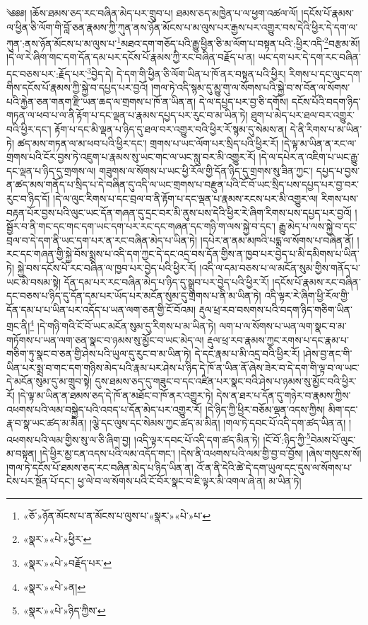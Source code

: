  ༄༅༅། །ཆོས་ཐམས་ཅད་རང་བཞིན་མེད་པར་གྲུབ་པ། ཐམས་ཅད་མཁྱེན་པ་ལ་ཕྱག་འཚལ་ལོ། །དངོས་པོ་རྣམས་ལ་ཕྱིན་ཅི་ལོག་གི་བློ་ཅན་རྣམས་ཀྱི་ཀུན་ནས་ཉོན་མོངས་པ་མ་ལུས་པར་རྒྱས་པར་འགྱུར་བས་དེའི་ཕྱིར་དེ་དག་ལ་ཀུན་:ནས་ཉོན་མོངས་པ་མ་ལུས་པ་\footnote{«ཅོ་»ཉོན་མོངས་པ་ན་མོངས་པ་ལུས་པ་«སྣར་»«པེ་»པ་}མཐའ་དག་གཅོད་པའི་རྒྱུ་ཕྱིན་ཅི་མ་ལོག་པ་བསྟན་པའི་:ཕྱིར་འདི་\footnote{«སྣར་»«པེ་»ཕྱིར་}བརྩམ་མོ། །དེ་ལ་རེ་ཞིག་གང་དག་དོན་དམ་པར་དངོས་པོ་རྣམས་ཀྱི་རང་བཞིན་བརྗོད་པ་ན། ཡང་དག་པར་དེ་དག་རང་བཞིན་དང་བཅས་པར་:རྗོད་པར་\footnote{«སྣར་»«པེ་»བརྗོད་པར་}བྱེད་དེ། དེ་དག་གི་ཕྱིན་ཅི་ལོག་ཡིན་པ་ཁོ་ནར་བསྟན་པའི་ཕྱིར། རིགས་པ་དང་ལུང་དག་གིས་དངོས་པོ་རྣམས་ཀྱི་སྐྱེ་བ་དཔྱད་པར་བྱའོ། །གལ་ཏེ་འདི་སྙམ་དུ་མྱུ་གུ་ལ་སོགས་པའི་སྐྱེ་བ་ས་བོན་ལ་སོགས་པའི་རྐྱེན་ཅན་གནག་རྫི་ཡན་ཆད་ལ་གྲགས་པ་ཁོ་ན་ཡིན་ན། དེ་ལ་དཔྱད་པར་བྱ་ཅི་དགོས། དངོས་པོའི་བདག་ཉིད་གཏན་ལ་ཕབ་པ་ལ་ནི་རྟོག་པ་དང་ལྡན་པ་རྣམས་དཔྱད་པར་རུང་བ་མ་ཡིན་ཏེ། ཐུག་པ་མེད་པར་ཐལ་བར་འགྱུར་བའི་ཕྱིར་དང་། རྟོག་པ་དང་མི་ལྡན་པ་ཉིད་དུ་ཐལ་བར་འགྱུར་བའི་ཕྱིར་རོ་སྙམ་དུ་སེམས་ན། དེ་ནི་རིགས་པ་མ་ཡིན་ཏེ། ཚད་མས་གཏན་ལ་མ་ཕབ་པའི་ཕྱིར་དང་། གྲགས་པ་ཡང་ལོག་པར་སྲིད་པའི་ཕྱིར་རོ། །དེ་ལྟ་མ་ཡིན་ན་རང་ལ་གྲགས་པའི་ངོར་བྱས་ཏེ་འཇུག་པ་རྣམས་སུ་ཡང་གང་ལ་ཡང་སླུ་བར་མི་འགྱུར་རོ། །དེ་ལ་དཔེར་ན་འཇིག་པ་ཡང་རྒྱུ་དང་ལྡན་པ་ཉིད་དུ་གྲགས་ལ། གཟུགས་ལ་སོགས་པ་ཡང་ཕྱི་རོལ་གྱི་དོན་ཉིད་དུ་གྲགས་སུ་ཟིན་ཀྱང་། དཔྱད་པ་བྱས་ན་ཚད་མས་གནོད་པ་སྲིད་པ་དེ་བཞིན་དུ་འདི་ལ་ཡང་གྲགས་པ་བརྫུན་པའི་ངོ་བོ་ཡང་སྲིད་པས་དཔྱད་པར་བྱ་བར་རུང་བ་ཉིད་དོ། །དེ་ལ་ལུང་རིགས་པ་དང་བྲལ་བ་ནི་རྟོག་པ་དང་ལྡན་པ་རྣམས་རངས་པར་མི་འགྱུར་ལ། རིགས་པས་བརྟན་པོར་བྱས་པའི་ལུང་ཡང་དོན་གཞན་དུ་དྲང་བར་མི་ནུས་པས་དེའི་ཕྱིར་རེ་ཞིག་རིགས་པས་དཔྱད་པར་བྱའོ། །སྦྱོར་བ་ནི་གང་དང་གང་དག་ཡང་དག་པར་རང་དང་གཞན་དང་གཉི་ག་ལས་སྐྱེ་བ་དང་། རྒྱུ་མེད་པ་ལས་སྐྱེ་བ་དང་བྲལ་བ་དེ་དག་ནི་ཡང་དག་པར་ན་རང་བཞིན་མེད་པ་ཡིན་ཏེ། །དཔེར་ན་ནམ་མཁའི་པདྨ་ལ་སོགས་པ་བཞིན་ནོ། །རང་དང་གཞན་གྱི་སྐྱེ་བོས་སྨྲས་པ་འདི་དག་ཀྱང་དེ་དང་འདྲ་བས་དོན་གྱིས་ན་ཁྱབ་པར་བྱེད་པ་མི་དམིགས་པ་ཡིན་ཏེ། སྐྱེ་བས་དངོས་པོ་རང་བཞིན་ལ་ཁྱབ་པར་བྱེད་པའི་ཕྱིར་རོ། །འདི་ལ་དམ་བཅས་པ་ལ་མངོན་སུམ་གྱིས་གནོད་པ་ཡང་མི་བསམ་སྟེ། དོན་དམ་པར་རང་བཞིན་མེད་པ་ཉིད་དུ་སྒྲུབ་པར་བྱེད་པའི་ཕྱིར་རོ། །དངོས་པོ་རྣམས་རང་བཞིན་དང་བཅས་པ་ཉིད་དུ་དོན་དམ་པར་ཡོད་པར་མངོན་སུམ་དུ་གྲགས་པ་ནི་མ་ཡིན་ཏེ། འདི་ལྟར་རེ་ཞིག་ཕྱི་རོལ་གྱི་དོན་དམ་པ་པ་ཡིན་པར་འདོད་པ་ཡན་ལག་ཅན་གྱི་ངོ་བོའམ། རྡུལ་ཕྲ་རབ་བསགས་པའི་བདག་ཉིད་གཅིག་ཡིན་གྲང་ནི།\footnote{«སྣར་»«པེ་»ན།} །དེ་གཉི་གའི་ངོ་བོ་ཡང་མངོན་སུམ་དུ་རིགས་པ་མ་ཡིན་ཏེ། ལག་པ་ལ་སོགས་པ་ཡན་ལག་སྣང་བ་མ་གཏོགས་པ་ཡན་ལག་ཅན་སྣང་བ་ཉམས་སུ་མྱོང་བ་ཡང་མེད་ལ། རྡུལ་ཕྲ་རབ་རྣམས་ཀྱང་རགས་པ་དང་རྣམ་པ་གཅིག་ཏུ་སྣང་བ་ཅན་གྱི་ཤེས་པའི་ཡུལ་དུ་རུང་བ་མ་ཡིན་ཏེ། དེ་དང་རྣམ་པ་མི་འདྲ་བའི་ཕྱིར་རོ། །ཤེས་བྱ་ནང་གི་ཡིན་པར་སྨྲ་བ་གང་དག་གཉིས་མེད་པའི་རྣམ་པར་ཤེས་པ་ཉིད་དེ་ཁོ་ན་ཡིན་ནོ་ཞེས་ཟེར་བ་དེ་དག་གི་ལྟ་བ་ལ་ཡང་དེ་མངོན་སུམ་དུ་མ་གྲུབ་སྟེ། དུས་ཐམས་ཅད་དུ་གཟུང་བ་དང་འཛིན་པར་སྣང་བའི་ཤེས་པ་ཉམས་སུ་མྱོང་བའི་ཕྱིར་རོ། །དེ་ལྟ་མ་ཡིན་ན་ཐམས་ཅད་དེ་ཁོ་ན་མཐོང་བ་ཁོ་ནར་འགྱུར་ཏེ། དེས་ན་ཐར་པ་དོན་དུ་གཉེར་བ་རྣམས་ཀྱིས་འཕགས་པའི་ལམ་བསྐྱེད་པའི་འབད་པ་དོན་མེད་པར་འགྱུར་རོ། །དེ་ཉིད་ཀྱི་ཕྱིར་བཅོམ་ལྡན་འདས་ཀྱིས། མིག་དང་རྣ་བ་སྣ་ཡང་ཚད་མ་མིན། །ལྕེ་དང་ལུས་དང་སེམས་ཀྱང་ཚད་མ་མིན། །གལ་ཏེ་དབང་པོ་འདི་དག་ཚད་ཡིན་ན། །འཕགས་པའི་ལམ་གྱིས་སུ་ལ་ཅི་ཞིག་བྱ། །འདི་ལྟར་དབང་པོ་འདི་དག་ཚད་མིན་ཏེ། །ངོ་བོ་:ཉིད་ཀྱི་\footnote{«སྣར་»«པེ་»ཉིད་ཀྱིས་}བེམས་པོ་ལུང་མ་བསྟན། །དེ་ཕྱིར་མྱ་ངན་འདས་པའི་ལམ་འདོད་གང་། །དེས་ནི་འཕགས་པའི་ལམ་གྱི་བྱ་བ་བྱོས། །ཞེས་གསུངས་སོ། །གལ་ཏེ་དངོས་པོ་ཐམས་ཅད་རང་བཞིན་མེད་པ་ཉིད་ཡིན་ན། འོ་ན་ནི་དེའི་ཚེ་དེ་དག་ཡུལ་དང་དུས་ལ་སོགས་པ་ངེས་པར་སྔོན་པོ་དང་། ཕྱ་ལེ་བ་ལ་སོགས་པའི་ངོ་བོར་སྣང་བ་ཇི་ལྟར་མི་འགལ་ཞེ་ན། མ་ཡིན་ཏེ། 